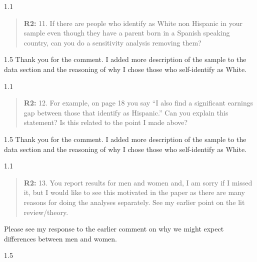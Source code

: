 \documentclass[12pt,english]{article}
\newcommand{\rrquote}{1.1}
\newcommand{\rrxspc}{1.5}
\begin{document}
\begin{refsection}
    \begin{spacing}{\rrquote}
        \begin{quotation}
        \textbf{R2: } 11. If there are people who identify as White non Hispanic in your sample even though they have a parent born in a Spanish speaking country, can you do a sensitivity analysis removing them?

        \end{quotation}
        \end{spacing}
        
        \begin{spacing}{\rrxspc}
            Thank you for the comment. I added more description of the sample to the data section and the reasoning of why I chose those who self-identify as White. 
    \end{spacing}

    \begin{spacing}{\rrquote}
        \begin{quotation}
        \textbf{R2: } 12. For example, on page 18 you say “I also find a significant earnings gap between those that identify as Hispanic.” Can you explain this statement? Is this related to the point I made above?

        \end{quotation}
        \end{spacing}
        
        \begin{spacing}{\rrxspc}
            Thank you for the comment. I added more description of the sample to the data section and the reasoning of why I chose those who self-identify as White. 
    \end{spacing}

    \begin{spacing}{\rrquote}
        \begin{quotation}
        \textbf{R2: } 13. You report results for men and women and, I am sorry if I missed it, but I would like to see this motivated in the paper as there are many reasons for doing the analyses separately. See my earlier point on the lit review/theory.
              
        \end{quotation}
        \end{spacing}
            Please see my response to the earlier comment on why we might expect differences between men and women.
        \begin{spacing}{\rrxspc}
            

\end{spacing}
\end{refsection}
\end{document}
